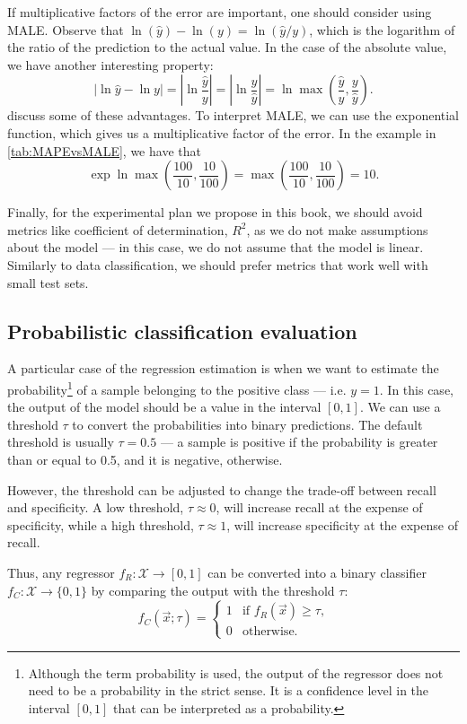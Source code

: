 If multiplicative factors of the error are important, one should consider using MALE.
Observe that $\ln(\hat{y}) - \ln(y) = \ln(\hat{y}/y)$, which is the logarithm of the
ratio of the prediction to the actual value.  In the case of the absolute value, we have
another interesting property: \[
  |\ln\hat{y} - \ln y| =
    |\ln\frac{\hat{y}}{y}| =
    |\ln\frac{y}{\hat{y}}| =
    \ln\max\left(\frac{\hat{y}}{y}, \frac{y}{\hat{y}}\right)\text{.}
\]
\textcite{Tofallis2015} discuss some of these advantages.  To
interpret MALE, we can use the exponential function, which gives us a multiplicative
factor of the error.  In the example in \cref{tab:MAPEvsMALE}, we have that \[
  \exp\ln\max\left(\frac{100}{10}, \frac{10}{100}\right) =
    \max\left(\frac{100}{10}, \frac{10}{100}\right) = 10\text{.}
\]

Finally, for the experimental plan we propose in this book, we should avoid metrics like
coefficient of determination, $R^2$, as we do not make assumptions about the \gls{model} --- in this
case, we do not assume that the \gls{model} is linear.  Similarly to data classification, we
should prefer metrics that work well with small test sets.

\subsection{Probabilistic classification evaluation}

A particular case of the regression estimation is when we want to estimate the
probability\footnote{Although the term probability is used, the output of the \gls{regressor}
does not need to be a probability in the strict sense.  It is a confidence level in the
interval $[0, 1]$ that can be interpreted as a probability.} of a sample belonging to the
positive class --- i.e. $y = 1$.  In this case, the output of the \gls{model} should be a
value in the interval $[0, 1]$.  We can use a threshold $\tau$ to convert the
probabilities into binary predictions.  The default threshold is usually $\tau = 0.5$ ---
a sample is positive if the probability is greater than or equal to 0.5, and it is negative,
otherwise.

However, the threshold can be adjusted to change the trade-off between recall and
specificity. A low threshold, $\tau \approx 0$, will increase recall at the expense of
specificity, while a high threshold, $\tau \approx 1$, will increase specificity at the
expense of recall.

Thus, any \gls{regressor} $f_R : \mathcal{X} \rightarrow [0, 1]$ can be converted into a binary
\gls{classifier} $f_C : \mathcal{X} \rightarrow \{0, 1\}$ by comparing the output with the
threshold $\tau$:
\begin{equation*}
  f_C(\vec{x}; \tau) = \begin{cases}
    1 & \text{if } f_R(\vec{x}) \geq \tau\text{,} \\
    0 & \text{otherwise}\text{.}
  \end{cases}
\end{equation*}

